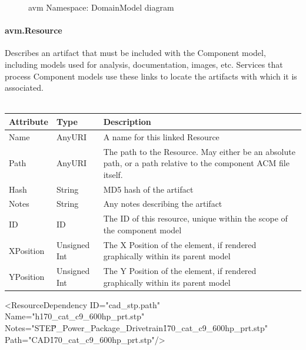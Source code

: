 \begin{figure}[h!]
\caption{avm Namespace: DomainModel diagram}
\end{figure}

\paragraph{avm.Resource}
Describes an artifact that must be included with the Component model, including models used for analysis, documentation, images, etc. Services that process Component models use these links to locate the artifacts with which it is associated.
\\ \\
\begin{tabular}{ l l p{12cm} }
\textbf{Attribute} & \textbf{Type} & \textbf{Description} \\ \hline
Name & AnyURI & A name for this linked Resource \\ \hline
Path & AnyURI & The path to the Resource. May either be an absolute path, or a path relative to the component ACM file itself. \\ \hline
Hash & String & MD5 hash of the artifact \\ \hline
Notes & String & Any notes describing the artifact \\ \hline
ID & ID & The ID of this resource, unique within the scope of the component model \\ \hline
XPosition & Unsigned Int & The X Position of the element, if rendered graphically within its parent model \\ \hline
YPosition & Unsigned Int & The Y Position of the element, if rendered graphically within its parent model \\ \hline
\end{tabular}

\begin{MyVerbatim}
  <ResourceDependency 
    ID="cad_stp.path" 
    Name="h170_cat_c9_600hp_prt.stp" 
    Notes="STEP\H_Power_Package_Drivetrain\h170_cat_c9_600hp_prt.stp" 
    Path="CAD\h170_cat_c9_600hp_prt.stp"/>
\end{MyVerbatim}


